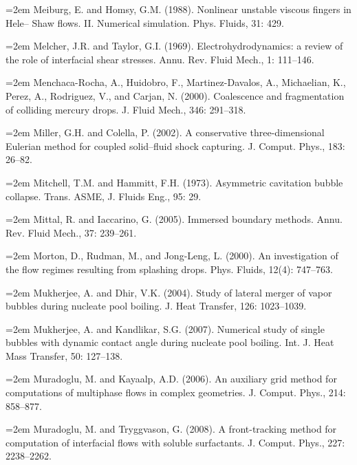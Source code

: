 \documentclass[11pt,a4paper,openany,fontset=none]{ctexbook}
\begin{document}
\par\hangindent=2em Meiburg, E. and Homsy, G.M. (1988). Nonlinear unstable viscous fingers in Hele-- Shaw flows. II. Numerical simulation. Phys. Fluids, 31: 429.


\par\hangindent=2em Melcher, J.R. and Taylor, G.I. (1969). Electrohydrodynamics: a review of the role of interfacial shear stresses. Annu. Rev. Fluid Mech., 1: 111--146.

\par\hangindent=2em Menchaca-Rocha, A., Huidobro, F., Martinez-Davalos, A., Michaelian, K., Perez, A., Rodriguez, V., and Carjan, N. (2000). Coalescence and fragmentation of colliding mercury drops. J. Fluid Mech., 346: 291--318.

\par\hangindent=2em Miller, G.H. and Colella, P. (2002). A conservative three-dimensional Eulerian method for coupled solid--fluid shock capturing. J. Comput. Phys., 183: 26--82.

\par\hangindent=2em Mitchell, T.M. and Hammitt, F.H. (1973). Asymmetric cavitation bubble collapse. Trans. ASME, J. Fluids Eng., 95: 29.

\par\hangindent=2em Mittal, R. and Iaccarino, G. (2005). Immersed boundary methods. Annu. Rev. Fluid Mech., 37: 239--261.

\par\hangindent=2em Morton, D., Rudman, M., and Jong-Leng, L. (2000). An investigation of the flow regimes resulting from splashing drops. Phys. Fluids, 12(4): 747--763.

\par\hangindent=2em Mukherjee, A. and Dhir, V.K. (2004). Study of lateral merger of vapor bubbles during nucleate pool boiling. J. Heat Transfer, 126: 1023--1039.

\par\hangindent=2em Mukherjee, A. and Kandlikar, S.G. (2007). Numerical study of single bubbles with dynamic contact angle during nucleate pool boiling. Int. J. Heat Mass Transfer, 50: 127--138.

\par\hangindent=2em Muradoglu, M. and Kayaalp, A.D. (2006). An auxiliary grid method for computations of multiphase flows in complex geometries. J. Comput. Phys., 214: 858--877.

\par\hangindent=2em Muradoglu, M. and Tryggvason, G. (2008). A front-tracking method for computation of interfacial flows with soluble surfactants. J. Comput. Phys., 227: 2238--2262.
\end{document}
